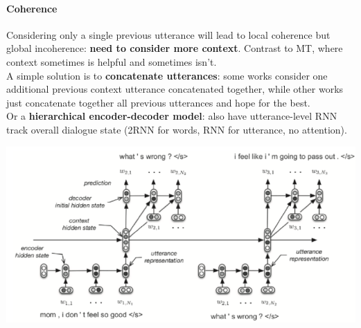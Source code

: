 \documentclass[10pt]{report}
\begin{document}
\paragraph{Coherence} Considering only a single previous utterance will lead to local coherence but global incoherence: \textbf{need to consider more context}. Contrast to MT, where context sometimes is helpful and sometimes isn't.\\
A simple solution is to \textbf{concatenate utterances}: some works consider one additional previous context utterance concatenated together, while other works just concatenate together all previous utterances and hope for the best.\\
Or a \textbf{hierarchical encoder-decoder model}: also have utterance-level RNN track overall dialogue state (2RNN for words, RNN for utterance, no attention).
\begin{center}
	\includegraphics[scale=0.5]{135.png}
\end{center}
\end{document}
